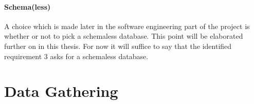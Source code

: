 \paragraph{Schema(less)}
\label{datamodel-schema}

A choice which is made later in the software engineering part of the project is whether or not to pick a schemaless database.
This point will be elaborated further on in this thesis.
For now it will suffice to say that the identified requirement 3 asks for a schemaless database.

\section{Data Gathering}
\label{datamodel-gathering}

